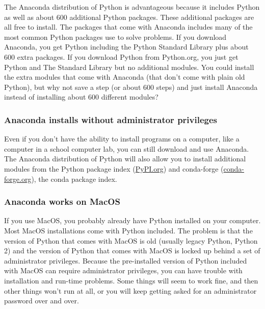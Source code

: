 \documentclass{book}
\begin{document}
The Anaconda distribution of Python is advantageous because it includes
Python as well as about 600 additional Python packages. These additional
packages are all free to install. The packages that come with Anaconda
includes many of the most common Python packages use to solve problems.
If you download Anaconda, you get Python including the Python Standard
Library plus about 600 extra packages. If you download Python from
Python.org, you just get Python and The Standard Library but no
additional modules. You could install the extra modules that come with
Anaconda (that don't come with plain old Python), but why not save a
step (or about 600 steps) and just install Anaconda instead of
installing about 600 different modules?

\hypertarget{anaconda-installs-without-administrator-privileges}{%
\subsubsection{Anaconda installs without administrator
privileges}\label{anaconda-installs-without-administrator-privileges}}

Even if you don't have the ability to install programs on a computer,
like a computer in a school computer lab, you can still download and use
Anaconda. The Anaconda distribution of Python will also allow you to
install additional modules from the Python package index
(\href{https://pypi.org/}{PyPI.org}) and conda-forge
(\href{https://conda-forge.org/}{conda-forge.org}), the conda package
index.

\hypertarget{anaconda-works-on-macos}{%
\subsubsection{Anaconda works on MacOS}\label{anaconda-works-on-macos}}

If you use MacOS, you probably already have Python installed on your
computer. Most MacOS installations come with Python included. The
problem is that the version of Python that comes with MacOS is old
(usually legacy Python, Python 2) and the version of Python that comes
with MacOS is locked up behind a set of administrator privileges.
Because the pre-installed version of Python included with MacOS can
require administrator privileges, you can have trouble with installation
and run-time problems. Some things will seem to work fine, and then
other things won't run at all, or you will keep getting asked for an
administrator password over and over.
\end{document}
